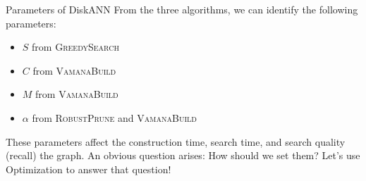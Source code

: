 \begin{frame}{Parameters of DiskANN}
    From the three algorithms, we can identify the following parameters:
    \begin{itemize}
        \item \(S\) from \textsc{GreedySearch}
        \item \(C\) from \textsc{VamanaBuild}
        \item \(M\) from \textsc{VamanaBuild}
        \item \(\alpha\) from \textsc{RobustPrune} and \textsc{VamanaBuild}
    \end{itemize}

    These parameters affect the construction time, search time, and search quality (recall) the graph. An obvious question arises: How should we set them? Let's use Optimization to answer that question!
\end{frame}
